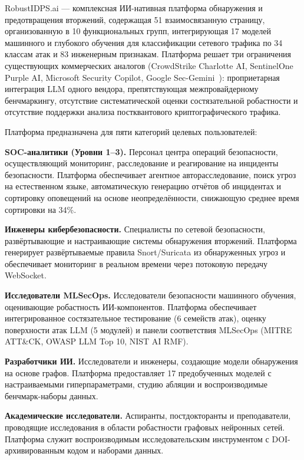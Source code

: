 RobustIDPS.ai --- комплексная ИИ-нативная платформа обнаружения и предотвращения вторжений, содержащая 51 взаимосвязанную страницу, организованную в 10 функциональных групп, интегрирующая 17 моделей машинного и глубокого обучения для классификации сетевого трафика по 34 классам атак и 83 инженерным признакам. Платформа решает три ограничения существующих коммерческих аналогов (CrowdStrike Charlotte AI, SentinelOne Purple AI, Microsoft Security Copilot, Google Sec-Gemini~\cite{Smith2023}): проприетарная интеграция LLM одного вендора, препятствующая межпровайдерному бенчмаркингу, отсутствие систематической оценки состязательной робастности и отсутствие поддержки анализа постквантового криптографического трафика.

Платформа предназначена для пяти категорий целевых пользователей:

\noindent\textbf{SOC-аналитики (Уровни 1--3).} Персонал центра операций безопасности, осуществляющий мониторинг, расследование и реагирование на инциденты безопасности. Платформа обеспечивает агентное авторасследование, поиск угроз на естественном языке, автоматическую генерацию отчётов об инцидентах и сортировку оповещений на основе неопределённости, снижающую среднее время сортировки на 34\%.

\noindent\textbf{Инженеры кибербезопасности.} Специалисты по сетевой безопасности, развёртывающие и настраивающие системы обнаружения вторжений. Платформа генерирует развёртываемые правила Snort/Suricata из обнаруженных угроз и обеспечивает мониторинг в реальном времени через потоковую передачу WebSocket.

\noindent\textbf{Исследователи MLSecOps.} Исследователи безопасности машинного обучения, оценивающие робастность ИИ-компонентов. Платформа обеспечивает интегрированное состязательное тестирование (6 семейств атак), оценку поверхности атак LLM (5 модулей) и панели соответствия MLSecOps (MITRE ATT\&CK, OWASP LLM Top 10, NIST AI RMF).

\noindent\textbf{Разработчики ИИ.} Исследователи и инженеры, создающие модели обнаружения на основе графов. Платформа предоставляет 17 предобученных моделей с настраиваемыми гиперпараметрами, студию абляции и воспроизводимые бенчмарк-наборы данных.

\noindent\textbf{Академические исследователи.} Аспиранты, постдокторанты и преподаватели, проводящие исследования в области робастности графовых нейронных сетей. Платформа служит воспроизводимым исследовательским инструментом с DOI-архивированным кодом и наборами данных.


